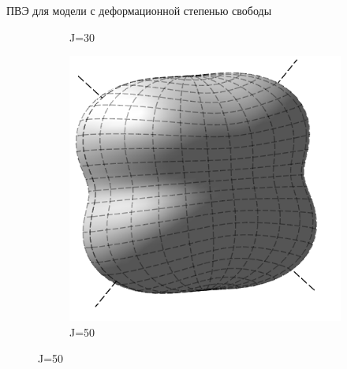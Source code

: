 \documentclass[hyperref={pdfpagelabels=false},usepdftitle=false, xcolor = dvipsnames]{beamer}
\begin{document}
\begin{frame}{ПВЭ для модели с деформационной степенью свободы}
\begin{varblock}[11cm]{}
\begin{figure}
\begin{subfigure}{0.3\textwidth}
		  \caption{J=30}
		\end{subfigure}
		\begin{subfigure}{0.3\textwidth}
		  \includegraphics[width=\textwidth]{../pictures/Rigid_RES_50.png}
		  \caption{J=50}
		\end{subfigure}  
	  \end{figure}
  \end{varblock}    
\end{frame}
\end{document}
